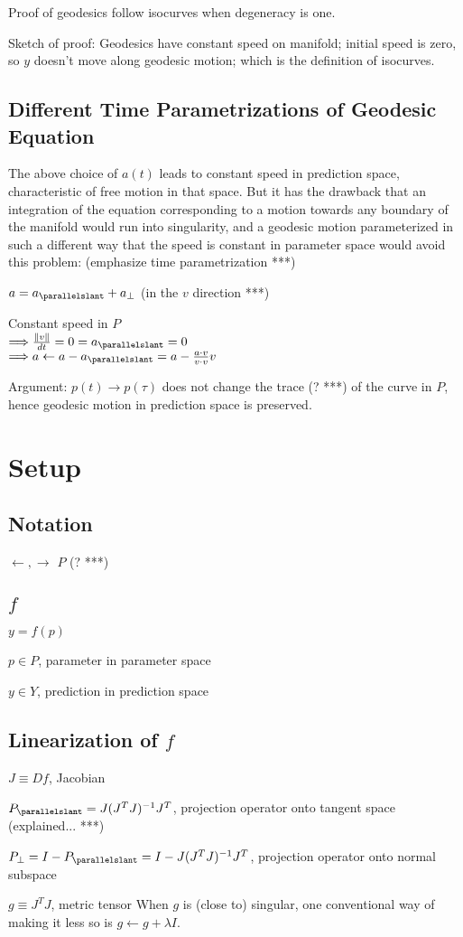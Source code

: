 \documentclass{article}
\begin{document}
Proof of geodesics follow isocurves when degeneracy is one.

Sketch of proof: Geodesics have constant speed on manifold; initial speed is zero, so $y$ doesn't move along geodesic motion; which is the definition of isocurves. 




\subsection{Different Time Parametrizations of Geodesic Equation}
The above choice of $a(t)$ leads to constant speed in prediction space, characteristic of free motion in that space. But it has the drawback that an integration of the equation corresponding to a motion towards any boundary of the manifold would run into singularity, and a geodesic motion parameterized in such a different way that the speed is constant in parameter space would avoid this problem: (emphasize time parametrization ***)

$a = a_{\parallelslant} + a_{\perp}$ (in the $v$ direction ***)

Constant speed in $P$ \\
$\Longrightarrow \frac{\Vert v \Vert}{dt} = 0 = a_{\parallelslant} = 0$ \\
$\Longrightarrow a \leftarrow a - a_{\parallelslant} = a - \frac{a \cdot v}{v \cdot v} v$

Argument: $p(t) \rightarrow p(\tau)$ does not change the trace (? ***) of the curve in $P$, hence geodesic motion in prediction space is preserved.

\section{Setup}
\subsection{Notation}
$\leftarrow, \rightarrow$
$P$ (? ***)     

\subsection{$f$}
$y=f(p)$

$p \in P$, parameter in parameter space

$y \in Y$, prediction in prediction space

\subsection{Linearization of $f$}
$J \equiv Df$, Jacobian

$P_{\parallelslant} =  J (J^T J)^{-1} J^T$, projection operator onto tangent space (explained... ***)

$P_{\perp} = I - P_{\parallelslant} = I - J (J^T J)^{-1} J^T$, projection operator onto normal subspace

$g \equiv J^T J$, metric tensor
When $g$ is (close to) singular, one conventional way of making it less so is $g \leftarrow g + \lambda I$. 
\end{document}

